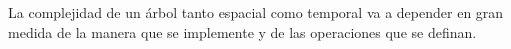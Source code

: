 La complejidad de un árbol tanto espacial como temporal va a depender en gran medida de la manera que se implemente y de las operaciones que se definan.